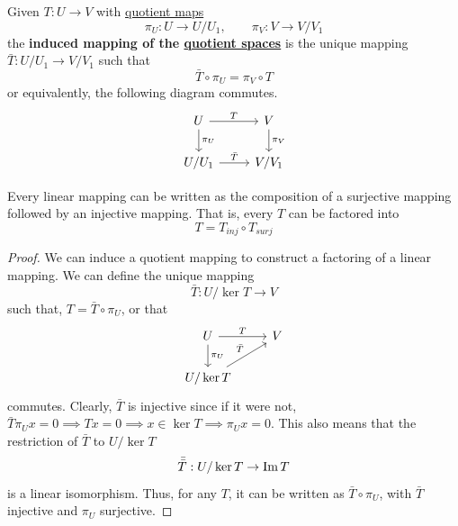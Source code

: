   \begin{definition}
    \label{def:induced-mapping-of-quotients}
    Given $T: U \to V$ with \hyperref[pst-def:quotient-map]{quotient maps} 
    \begin{equation}
      \pi_U: U \to U / U_1, \qquad \pi_V: V \to V / V_1
    \end{equation}
    the \textbf{induced mapping of the \hyperref[pst-thm:quotient-spaces]{quotient spaces}} is the unique mapping $\bar{T}: U/U_1 \to V / V_1$ such that 
    \begin{equation}
      \bar{T} \circ \pi_U = \pi_V \circ T
    \end{equation}
    or equivalently, the following diagram commutes. 
    \begin{equation}
      \begin{tikzcd}
              U \arrow{r}{T} \arrow{d}{\pi_U} & V \arrow{d}{\pi_V}\\
              U / U_1 \arrow{r}{\bar{T}} & V / V_1
          \end{tikzcd}
    \end{equation}
  \end{definition} 

  \begin{theorem}
    \label{thm:first-isomorphism-theorem}
    Every linear mapping can be written as the composition of a surjective mapping followed by an injective mapping. That is, every $T$ can be factored into 
    \begin{equation}
      T = T_{inj} \circ T_{surj}
    \end{equation}
  \end{theorem}
  \begin{proof}
    We can induce a quotient mapping to construct a factoring of a linear mapping. We can define the unique mapping 
    \begin{equation}
      \bar{T}: U / \ker{T} \to V
    \end{equation}
    such that, $T = \bar{T} \circ \pi_U$, or that 
    \begin{equation}
      \begin{tikzcd}
             U \arrow{r}{T} \arrow{d}{\pi_U} & V \\
             U / \ker{T} \arrow{ru}{\bar{T}}
          \end{tikzcd}
    \end{equation}
    commutes. Clearly, $\bar{T}$ is injective since if it were not, $\bar{T} \pi_U x = 0 \implies T x = 0 \implies x \in \ker{T} \implies \pi_U x = 0$. This also means that the restriction of $\bar{T}$ to $U / \ker{T}$
    \begin{equation}
      \bar{\bar{T}}: U / \ker{T} \to \operatorname{Im}{T}
    \end{equation}
    is a linear isomorphism. Thus, for any $T$, it can be written as $\bar{T} \circ \pi_U$, with $\bar{T}$ injective and $\pi_U$ surjective. 
  \end{proof}

